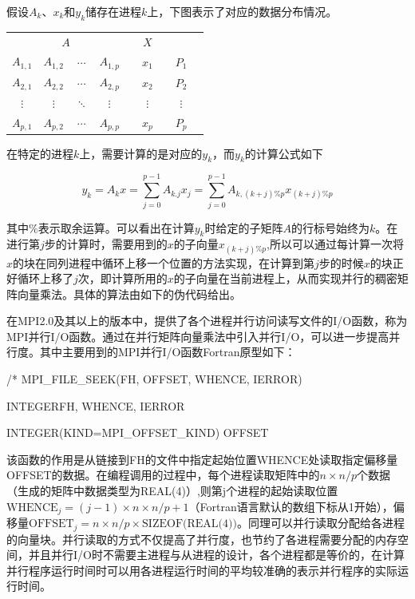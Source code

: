 \documentclass{article}
\begin{document}
假设$A_{k}$、$x_{k}$和$y_{k}$储存在进程$k$上，下图表示了对应的数据分布情况。

\begin{center}
	\renewcommand\tabcolsep{7pt}
	\begin{tabular}{cccc|c|c|ccc}
		\multicolumn{4}{c}{\bf{$A$}}& \multicolumn{1}{c}{ }& \multicolumn{1}{c}{\bf{$X$}}& &\\
		\cline{1-4} \cline{6-6}
		\multicolumn{1}{|c}{\bf{$A_{1,1}$}}& $A_{1,2}$& $\cdots$& $A_{1,p}$& & $x_{1}$& &$P_{1}$\\
		\cline{1-4}\cline{6-6}
		\cmidrule[0.25pt]{1-8}
		\cline{1-4}\cline{6-6}
		\multicolumn{1}{|c}{\bf{$A_{2,1}$}}& $A_{2,2}$& $\cdots$& $A_{2,p}$& & $x_{2}$& &$P_{2}$\\
		\cline{1-4}\cline{6-6}
		\cmidrule[0.25pt]{1-8}
		\cline{1-4}\cline{6-6}
		\multicolumn{1}{|c}{$\vdots$}& $\vdots$& $\ddots$& $\vdots$& & $\vdots$& &$\vdots$\\
		\cline{1-4}\cline{6-6}
		\cmidrule[0.25pt]{1-8}
		\cline{1-4}\cline{6-6}
		\multicolumn{1}{|c}{\bf{$A_{p,1}$}}& $A_{p,2}$& $\cdots$& $A_{p,p}$& & $x_{p}$& &$P_{p}$\\
		\cline{1-4}\cline{6-6}
	\end{tabular}
\end{center}

在特定的进程$k$上，需要计算的是对应的$y_{k}$，而$y_{k}$的计算公式如下

$$y_{k}=A_{k}x=\sum_{j=0}^{p-1}A_{k.j}x_{j}=\sum_{j=0}^{p-1}A_{k,(k+j)\% p}x_{(k+j)\% p}$$

其中$\%$表示取余运算。可以看出在计算$y_{k}$时给定的子矩阵$A$的行标号始终为$k$。在进行第$j$步的计算时，需要用到的$x$的子向量$x_{(k+j)\%p}$,所以可以通过每计算一次将$x$的块在同列进程中循环上移一个位置的方法实现，在计算到第$j$步的时候$x$的块正好循环上移了$j$次，即计算所用的$x$的子向量在当前进程上，从而实现并行的稠密矩阵向量乘法。具体的算法由如下的伪代码给出。

在MPI2.0及其以上的版本中，提供了各个进程并行访问读写文件的I/O函数，称为MPI并行I/O函数。通过在并行矩阵向量乘法中引入并行I/O，可以进一步提高并行度。其中主要用到的MPI并行I/O函数Fortran原型如下：

/*  MPI\_FILE\_SEEK(FH, OFFSET, WHENCE, IERROR) 

\qquad INTEGER\qquad\qquad\qquad  FH, WHENCE, IERROR

\qquad  INTEGER(KIND=MPI\_OFFSET\_KIND)  OFFSET

该函数的作用是从链接到FH的文件中指定起始位置WHENCE处读取指定偏移量OFFSET的数据。在编程调用的过程中，每个进程读取矩阵中的$n\times n/p$个数据（生成的矩阵中数据类型为REAL(4)）,则第j个进程的起始读取位置$\textrm{WHENCE}_{j}=(j-1)\times n\times n/p+1$（Fortran语言默认的数组下标从1开始），偏移量$\textrm{OFFSET}_{j}=n\times n/p\times\textrm{SIZEOF(REAL(4))}$。同理可以并行读取分配给各进程的向量块。并行读取的方式不仅提高了并行度，也节约了各进程需要分配的内存空间，并且并行I/O时不需要主进程与从进程的设计，各个进程都是等价的，在计算并行程序运行时间时可以用各进程运行时间的平均较准确的表示并行程序的实际运行时间。
\end{document}
